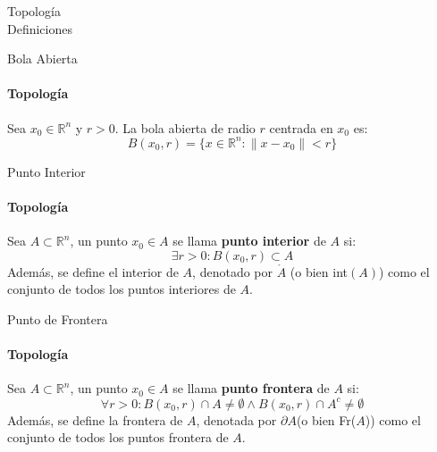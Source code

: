 \documentclass{plantillaPPT}
\begin{document}
\primeraDiapo

\begin{frame}[plain]
    \centering
    {\Huge {} Topología} \\
    {\large {} Definiciones}
\end{frame}

\begin{frame}{Bola Abierta}
\framesubtitle{Topología}

\begin{definicion}
    Sea \(x_0\in\mathbb{R}^n\) y \(r>0\). La bola abierta de radio \(r\) centrada en \(x_0\) es:
    \[B(x_0, r) = \{x\in\mathbb{R}^n: \|x-x_0\|<r\}\]
\end{definicion}
    
\end{frame}

\begin{frame}{Punto Interior}
\framesubtitle{Topología}

\begin{definicion}
    Sea \(A\subset\mathbb{R}^n\), un punto \(x_0\in A\) se llama \textbf{punto interior} de \(A\) si:
    \[\exists r>0:B(x_0,r)\subset A\]
    Además, se define el interior de \(A\), denotado por \(\mathring{A}\) (o bien int\((A)\)) como el conjunto de todos los puntos interiores de \(A\).
\end{definicion}

\end{frame}

\begin{frame}{Punto de Frontera}
\framesubtitle{Topología}

\begin{definicion}
    Sea \(A\subset\mathbb{R}^n\), un punto \(x_0\in A\) se llama \textbf{punto frontera} de \(A\) si:
    \[ \forall r>0: B(x_0,r)\cap A\neq \emptyset \land B(x_0,r)\cap A^c \neq \emptyset \]
    Además, se define la frontera de \(A\), denotada por \(\partial A\)(o bien Fr(\(A\))) como el conjunto de todos los puntos frontera de \(A\).
\end{definicion}

\end{frame}
\end{document}
